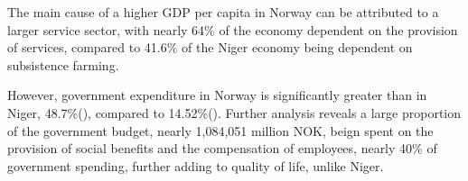 \documentclass[11pt, a4paper]{article}
\begin{document}
		The main cause of a higher GDP per capita in Norway can be attributed to a larger service sector, with nearly 64\% of the economy dependent on the provision of services, compared to 41.6\% of the Niger economy being dependent on subsistence farming.
		
		However, government expenditure in Norway is significantly greater than in Niger, 48.7\%(\citeauthor{tradingeconomicsNorwayGovernmentSpending2018}), compared to 14.52\%(\citeauthor{globaleconomyNigerGovernmentSpending2010}). Further analysis reveals a large proportion of the government budget, nearly 1,084,051 million NOK, beign spent on the provision of social benefits and the compensation of employees, nearly 40\% of government spending, further adding to quality of life, unlike Niger.

				\vspace*{-6mm}
\end{document}
